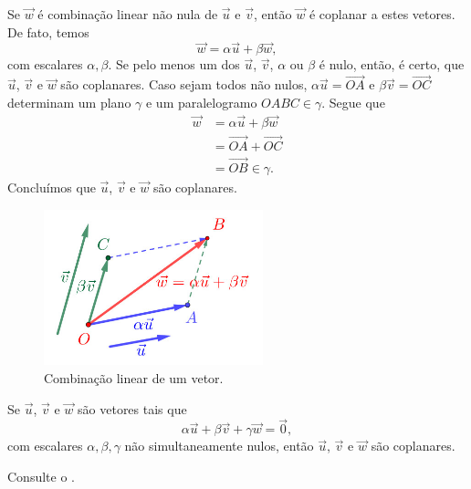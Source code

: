 Se $\vec{w}$ é combinação linear não nula de $\vec{u}$ e $\vec{v}$, então $\vec{w}$ é coplanar a estes vetores. De fato, temos
\begin{equation}
  \vec{w} = \alpha\vec{u} + \beta\vec{w},
\end{equation}
com escalares $\alpha,\beta$. Se pelo menos um dos $\vec{u}$, $\vec{v}$, $\alpha$ ou $\beta$ é nulo, então, é certo, que $\vec{u}$, $\vec{v}$ e $\vec{w}$ são coplanares. Caso sejam todos não nulos, $\alpha\vec{u}=\overrightarrow{OA}$ e $\beta\vec{v}=\overrightarrow{OC}$ determinam um plano $\gamma$ e um paralelogramo $OABC\in\gamma$. Segue que
\begin{align}
  \vec{w} &= \alpha\vec{u} + \beta\vec{w}\\
          &= \overrightarrow{OA} + \overrightarrow{OC}\\
          &= \overrightarrow{OB}\in\gamma. 
\end{align}
Concluímos que $\vec{u}$, $\vec{v}$ e $\vec{w}$ são coplanares.

\begin{figure}[h]
  \centering
  \includegraphics[width=2.5in]{./cap_base/dados/fig_comb3vet/fig.jpg}
  \caption{Combinação linear de um vetor.}
  \label{cap_base_sec_comblin:fig:comb3vet}
\end{figure}

\begin{proposicao}\label{cap_base_sec_comblin:prop:comb3vet}
  Se $\vec{u}$, $\vec{v}$ e $\vec{w}$ são vetores tais que
  \begin{equation}
    \alpha\vec{u} + \beta\vec{v} + \gamma\vec{w} = \vec{0},
  \end{equation}
  com escalares $\alpha,\beta,\gamma$ não simultaneamente nulos, então $\vec{u}$, $\vec{v}$ e $\vec{w}$ são coplanares.
\end{proposicao}
\begin{demonstracao}
  Consulte o .
\end{demonstracao}

